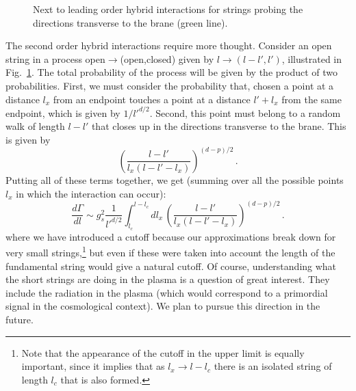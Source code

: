 \documentclass[a4paper,11pt]{article}
\newcommand{\lr}[1]{\left(#1\right)}
\begin{document}
\begin{figure}
    \centering
{}
    \caption{Next to leading order hybrid interactions for strings probing the directions transverse to the brane (green line).}
    \label{fig:transverse-hybrid}
\end{figure}

The second order hybrid interactions require more thought. 
Consider an open string in a process open$\rightarrow$(open,closed) given by $l\rightarrow (l-l',l')$, illustrated in Fig.~\ref{fig:transverse-hybrid}.
The total probability of the process will be given by the product of two probabilities. 
First, we must consider the probability that, chosen a point at a distance $l_x$ from an endpoint touches a point at a distance $l'+l_x$ from the same endpoint, which is given by $1/l'^{d/2}$.
Second, this point must belong to a random walk of length $l-l'$ that closes up in the directions transverse to the brane.
This is given by 
\begin{equation}
    \lr{\frac{l-l'}{l_x(l-l'-l_x)}}^{(d-p)/2}\, .
\end{equation}
Putting all of these terms together, we get (summing over all the possible points $l_x$ in which the interaction can occur):
\begin{equation}
    \frac{d\Gamma}{dl}\sim g_s^2\frac{1}{l'^{d/2}}\int_{l_c}^{l-l_c}{dl_x\, \lr{\frac{l-l'}{l_x(l-l'-l_x)}}^{(d-p)/2}} \, .
\end{equation}
where we have introduced a cutoff because our approximations break down for very small strings,\footnote{Note that the appearance of the cutoff in the upper limit is equally important, since it implies that as $l_x \to l-l_c$ there is an isolated string of length $l_c$ that is also formed.} but even if these were taken into account the length of the fundamental string would give a natural cutoff. Of course, understanding what the short strings are doing in the plasma
is a question of great interest. They include the radiation in the plasma
(which would correspond to a primordial signal in the cosmological context). We plan to  pursue this direction in the future.
\\
\end{document}
